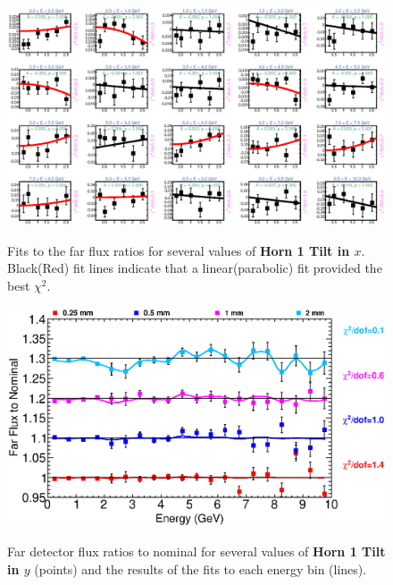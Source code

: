 \begin{figure}[ht]
  \begin{center}
    {\includegraphics[width=5.0in]{figures/Horn1XTilt_far_fits.eps}}
  \end{center}
\caption{ Fits to the far flux ratios for several values of {\bf Horn 1 Tilt in $x$}. Black(Red) fit lines indicate that a linear(parabolic) fit provided the best $\chi^2$. }
\end{figure}

\begin{figure}[ht]
  \begin{center}
    {\includegraphics[width=6.0in]{figures/Horn1YTilt_far_summary.eps}}
  \end{center}
\caption{ Far detector flux ratios to nominal for several values of {\bf Horn 1 Tilt in $y$} (points) and the results of the fits to each energy bin (lines).}
\end{figure}

